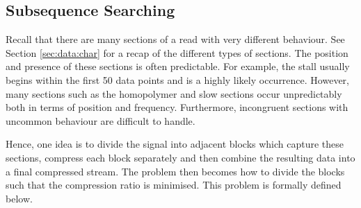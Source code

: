 \subsection{Subsequence Searching}
Recall that there are many sections of a read with very different behaviour. See
Section \ref{sec:data:char} for a recap of the different types of sections. The
position and presence of these sections is often predictable. For example, the
stall usually begins within the first 50 data points and is a highly likely
occurrence. However, many sections such as the homopolymer and slow sections
occur unpredictably both in terms of position and frequency. Furthermore,
incongruent sections with uncommon behaviour are difficult to handle.

Hence, one idea is to divide the signal into adjacent blocks which capture these
sections, compress each block separately and then combine the resulting data
into a final compressed stream. The problem then becomes how to divide the
blocks such that the compression ratio is minimised. This problem is formally
defined below.




